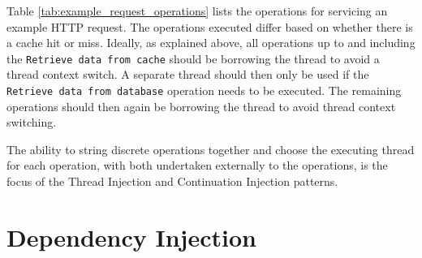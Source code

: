 \documentclass[prodmode]{style/acmlarge}
\begin{document}
Table \ref{tab:example_request_operations} lists the operations for servicing an
example HTTP request.  The operations executed differ based on whether there is
a cache hit or miss.  Ideally, as explained above, all operations up to and
including the \texttt{Retrieve data from cache} should be borrowing the thread
to avoid a thread context switch.  A separate thread should then only be used if
the \texttt{Retrieve data from database} operation needs to be executed.  The
remaining operations should then again be borrowing the thread to avoid thread
context switching.

\begin{table}[t]
\label{tab:example_request_operations}
\end{table}

The ability to string discrete operations together and choose the executing
thread for each operation, with both undertaken externally to the operations, is
the focus of the Thread Injection and Continuation Injection patterns.


\section{Dependency Injection}
\end{document}
